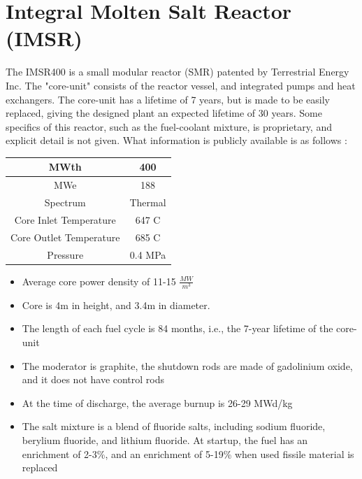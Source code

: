 \documentclass[letterpaper]{article}
\begin{document}
\section{Integral Molten Salt Reactor (IMSR)}

The IMSR400 is a small modular reactor (SMR) patented by Terrestrial Energy Inc.  The "core-unit" consists of the reactor vessel, and integrated pumps and heat exchangers.  The core-unit has a lifetime of 7 years, but is made to be easily replaced, giving the designed plant an expected lifetime of 30 years.  Some specifics of this reactor, such as the fuel-coolant mixture, is proprietary, and explicit detail is not given.  What information is publicly available is as follows \cite{leblanc_18_2017}:

\begin{center}
\begin{tabular}{|c|c|}
\hline
MWth & 400 \\
\hline
MWe & 188 \\
\hline
Spectrum & Thermal \\
\hline
Core Inlet Temperature & 647 C \\
\hline
Core Outlet Temperature & 685 C\\
\hline
Pressure & 0.4 MPa \\
\hline
\end{tabular}
\end{center}

\begin{itemize}
\item Average core power density of 11-15 $\frac{MW}{m^{3}}$
\item Core is 4m in height, and 3.4m in diameter.
\item The length of each fuel cycle is 84 months, i.e., the 7-year lifetime of the core-unit
\item The moderator is graphite, the shutdown rods are made of gadolinium oxide, and it does not have control rods
\item At the time of discharge, the average burnup is 26-29 MWd/kg
\item The salt mixture is a blend of fluoride salts, including sodium fluoride, berylium fluoride, and lithium fluoride.  At startup, the fuel has an enrichment of 2-3\%, and an enrichment of 5-19\% when used fissile material is replaced
\end{itemize}
\end{document}
